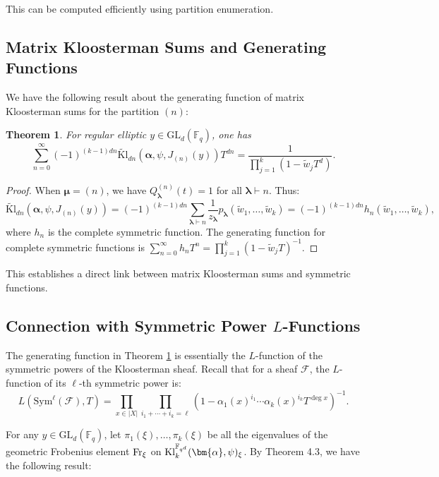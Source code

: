 \documentclass[11pt]{article}
\newtheorem{theorem}{Theorem}[section]
\newcommand{\Fq}{\mathbb{F}_q}
\newcommand{\GL}{\mathrm{GL}}
\newcommand{\tKl}{\widetilde{\mathrm{Kl}}}
\newcommand{\Sym}{\mathrm{Sym}}
\begin{document}
This can be computed efficiently using partition enumeration.

\subsection{Matrix Kloosterman Sums and Generating Functions}

We have the following result about the generating function of matrix Kloosterman sums for the partition $(n)$:
\medskip

\begin{theorem} For regular elliptic $y \in \GL_d(\Fq)$, one has
\label{thm:generating_function}
\[
\sum_{n=0}^\infty (-1)^{(k-1)dn} \tKl_{dn}(\bm{\alpha}, \psi, J_{(n)}(y)) T^{dn} = \frac{1}{\prod_{j=1}^k (1 - \widetilde{w}_j T^d)}.
\]
\end{theorem}

\begin{proof}
When $\bm{\mu} = (n)$, we have $Q_{\bm{\lambda}}^{(n)}(t) = 1$ for all $\bm{\lambda} \vdash n$. Thus:
\[
\tKl_{dn}(\bm{\alpha}, \psi, J_{(n)}(y)) = (-1)^{(k-1)dn} \sum_{\bm{\lambda} \vdash n} \frac{1}{z_{\bm{\lambda}}} p_{\bm{\lambda}}(\widetilde{w}_1, \ldots, \widetilde{w}_k) = (-1)^{(k-1)dn} h_n(\widetilde{w}_1, \ldots, \widetilde{w}_k),
\]
where $h_n$ is the complete symmetric function. The generating function for complete symmetric functions is $\sum_{n=0}^\infty h_n T^n = \prod_{j=1}^k (1 - \widetilde{w}_j T)^{-1}$.
\end{proof}

This establishes a direct link between matrix Kloosterman sums and symmetric functions.

\subsection{Connection with Symmetric Power $L$-Functions}

The generating function in Theorem \ref{thm:generating_function} is essentially the $L$-function of the symmetric powers of the Kloosterman sheaf. Recall that for a sheaf $\mathcal{F}$, the $L$-function of its $\ell$-th symmetric power is:
\[
L(\Sym^\ell(\mathcal{F}), T) = \prod_{x \in |X|} \prod_{i_1 + \cdots + i_k = \ell} (1 - \alpha_1(x)^{i_1} \cdots \alpha_k(x)^{i_k} T^{\deg x})^{-1}.
\]

For any $y \in \mathrm{GL}_d(\mathbb{F}_q)$, let 
$\pi_1(\xi), \ldots, \pi_k(\xi)$ be all the eigenvalues of the 
geometric Frobenius element ${\rm Fr}_\xi$ on ${\rm Kl}_k^{\mathbb{F}_{q^d}}(\bm{\alpha}, \psi)_\xi$. By Theorem 4.3, we have the following result:
\medskip
\end{document}
